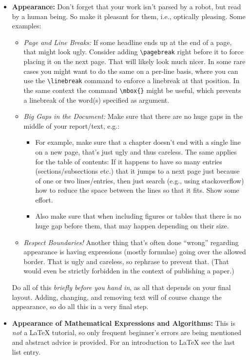 \begin{itemize}
  \item \textbf{Appearance:} Don't forget that your work isn't parsed by a robot, but read by a human being. So make it pleasant for them, i.e., optically pleasing. Some examples:
  \begin{itemize}
    \item \emph{Page and Line Breaks:} If some headline ends up at the end of a page, that might look ugly. Consider adding \verb!\pagebreak! right before it to force placing it on the next page. That will likely look much nicer. In some rare cases you might want to do the same on a per-line basis, where you can use the \verb!\linebreak! command to enforce a linebreak at that position. In the same context the command \verb!\mbox{}! might be useful, which prevents a linebreak of the word(s) specified as argument.
    \item \emph{Big Gaps in the Document:} Make sure that there are no huge gaps in the middle of your report/text, e.g.:
    \begin{itemize}
      \item For example, make sure that a chapter doesn't end with a single line on a new page, that's just ugly and thus careless. The same applies for the table of contents: If it happens to have so many entries (sections/subsections etc.) that it jumps to a next page just because of one or two lines/entries, then just search (e.g., using stackoverflow) how to reduce the space between the lines so that it fits. Show some effort.
      \item Also make sure that when including figures or tables that there is no huge gap before them, that may happen depending on their size.
    \end{itemize}
    \item \emph{Respect Boundaries!} Another thing that's often done ``wrong'' regarding appearance is having expressions (mostly formulae) going over the allowed border. That is ugly and careless, so rephrase to prevent that. (That would even be strictly forbidden in the context of publishing a paper.)
  \end{itemize}
  Do all of this \emph{briefly before you hand in}, as all that depends on your final layout. Adding, changing, and removing text will of course change the appearance, so do all this in a very final step.
  
  
  \item \textbf{Appearance of Mathematical Expressions and Algorithms:} This is \emph{not} a \LaTeX{} tutorial, so only frequent beginner's errors are being mentioned and abstract advice is provided. For an introduction to \LaTeX{} see the last list entry.
  \begin{itemize}
    

\end{itemize}
\end{itemize}

